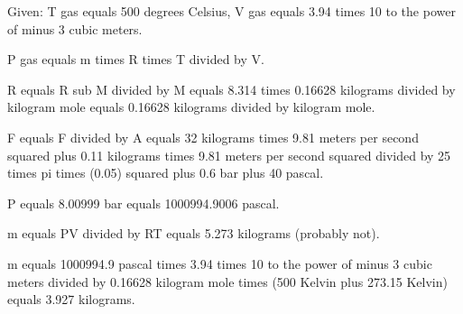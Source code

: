 Given: T gas equals 500 degrees Celsius, V gas equals 3.94 times 10 to the power of minus 3 cubic meters.

P gas equals m times R times T divided by V.

R equals R sub M divided by M equals 8.314 times 0.16628 kilograms divided by kilogram mole equals 0.16628 kilograms divided by kilogram mole.

F equals F divided by A equals 32 kilograms times 9.81 meters per second squared plus 0.11 kilograms times 9.81 meters per second squared divided by 25 times pi times (0.05) squared plus 0.6 bar plus 40 pascal.

P equals 8.00999 bar equals 1000994.9006 pascal.

m equals PV divided by RT equals 5.273 kilograms (probably not).

m equals 1000994.9 pascal times 3.94 times 10 to the power of minus 3 cubic meters divided by 0.16628 kilogram mole times (500 Kelvin plus 273.15 Kelvin) equals 3.927 kilograms.